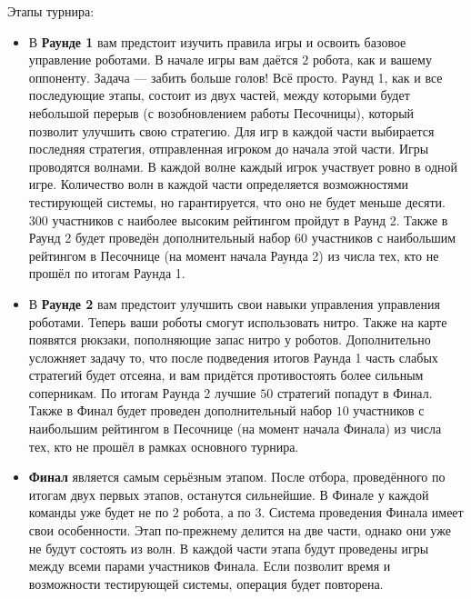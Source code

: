 Этапы турнира:
\begin{itemize}
      \item
            В \textbf{Раунде 1} вам предстоит изучить правила игры и освоить базовое управление роботами.
            В начале игры вам даётся $2$ робота, как и вашему оппоненту.
            Задача --- забить больше голов! Всё просто.
            Раунд 1, как и все последующие этапы, состоит из двух частей,
            между которыми будет небольшой перерыв (с возобновлением работы Песочницы),
            который позволит улучшить свою стратегию.
            Для игр в каждой части выбирается последняя стратегия, отправленная игроком до начала этой части.
            Игры проводятся волнами.
            В каждой волне каждый игрок участвует ровно в одной игре.
            Количество волн в каждой части определяется возможностями тестирующей системы,
            но гарантируется, что оно не будет меньше десяти.
            $300$ участников с наиболее высоким рейтингом пройдут в Раунд 2.
            Также в Раунд 2 будет проведён дополнительный набор $60$ участников с наибольшим рейтингом в Песочнице
            (на момент начала Раунда 2)
            из числа тех, кто не прошёл по итогам Раунда 1.
      \item
            В \textbf{Раунде 2} вам предстоит улучшить свои навыки управления управления роботами.
            Теперь ваши роботы смогут использовать нитро.
            Также на карте появятся рюкзаки, пополняющие запас нитро у роботов.
            Дополнительно усложняет задачу то, что после подведения итогов Раунда 1 часть слабых стратегий будет отсеяна,
            и вам придётся противостоять более сильным соперникам.
            По итогам Раунда 2 лучшие $50$ стратегий попадут в Финал.
            Также в Финал будет проведен дополнительный набор $10$ участников с наибольшим рейтингом в Песочнице
            (на момент начала Финала)
            из числа тех, кто не прошёл в рамках основного турнира.
      \item
            \textbf{Финал} является самым серьёзным этапом.
            После отбора, проведённого по итогам двух первых этапов, останутся сильнейшие.
            В Финале у каждой команды уже будет не по $2$ робота, а по $3$.
            Система проведения Финала имеет свои особенности.
            Этап по-прежнему делится на две части, однако они уже не будут состоять из волн.
            В каждой части этапа будут проведены игры между всеми парами участников Финала.
            Если позволит время и возможности тестирующей системы, операция будет повторена.
\end{itemize}

